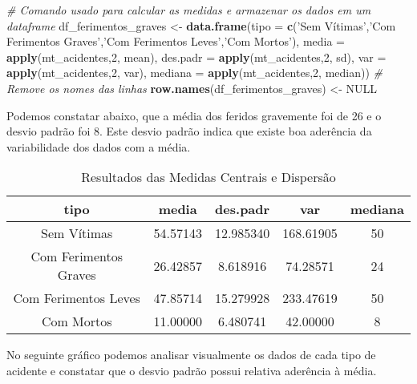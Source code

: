 \documentclass[portuguese,]{article}
\newenvironment{Shaded}{\begin{snugshade}}{\end{snugshade}}
\newcommand{\KeywordTok}[1]{\textcolor[rgb]{0.13,0.29,0.53}{\textbf{#1}}}
\newcommand{\DataTypeTok}[1]{\textcolor[rgb]{0.13,0.29,0.53}{#1}}
\newcommand{\DecValTok}[1]{\textcolor[rgb]{0.00,0.00,0.81}{#1}}
\newcommand{\StringTok}[1]{\textcolor[rgb]{0.31,0.60,0.02}{#1}}
\newcommand{\CommentTok}[1]{\textcolor[rgb]{0.56,0.35,0.01}{\textit{#1}}}
\newcommand{\OtherTok}[1]{\textcolor[rgb]{0.56,0.35,0.01}{#1}}
\newcommand{\NormalTok}[1]{#1}
\begin{document}
\begin{Shaded}
\begin{Highlighting}[]
\CommentTok{# Comando usado para calcular as medidas e armazenar os dados em um dataframe}
\NormalTok{df_ferimentos_graves <-}\StringTok{  }\KeywordTok{data.frame}\NormalTok{(}\DataTypeTok{tipo    =} \KeywordTok{c}\NormalTok{(}\StringTok{'Sem Vítimas'}\NormalTok{,}\StringTok{'Com Ferimentos Graves'}\NormalTok{,}\StringTok{'Com Ferimentos Leves'}\NormalTok{,}\StringTok{'Com Mortos'}\NormalTok{),}
                                     \DataTypeTok{media   =} \KeywordTok{apply}\NormalTok{(mt_acidentes,}\DecValTok{2}\NormalTok{, mean),}
                                     \DataTypeTok{des.padr  =} \KeywordTok{apply}\NormalTok{(mt_acidentes,}\DecValTok{2}\NormalTok{, sd),}
                                     \DataTypeTok{var     =} \KeywordTok{apply}\NormalTok{(mt_acidentes,}\DecValTok{2}\NormalTok{, var),}
                                     \DataTypeTok{mediana =} \KeywordTok{apply}\NormalTok{(mt_acidentes,}\DecValTok{2}\NormalTok{, median))}
\CommentTok{# Remove os nomes das linhas}
\KeywordTok{row.names}\NormalTok{(df_ferimentos_graves) <-}\StringTok{ }\OtherTok{NULL}
\end{Highlighting}
\end{Shaded}

Podemos constatar abaixo, que a média dos feridos gravemente foi de 26 e
o desvio padrão foi 8. Este desvio padrão indica que existe boa
aderência da variabilidade dos dados com a média.

\begin{table}[t]

\caption{\label{tab:tabela acidentes calculada}Resultados das Medidas Centrais e Dispersão}
\centering
\begin{tabular}{c|c|c|c|c}
\hline
tipo & media & des.padr & var & mediana\\
\hline
Sem Vítimas & 54.57143 & 12.985340 & 168.61905 & 50\\
\hline
Com Ferimentos Graves & 26.42857 & 8.618916 & 74.28571 & 24\\
\hline
Com Ferimentos Leves & 47.85714 & 15.279928 & 233.47619 & 50\\
\hline
Com Mortos & 11.00000 & 6.480741 & 42.00000 & 8\\
\hline
\end{tabular}
\end{table}

No seguinte gráfico podemos analisar visualmente os dados de cada tipo
de acidente e constatar que o desvio padrão possui relativa aderência à
média.
\end{document}
